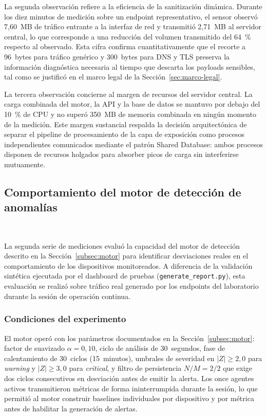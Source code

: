 La segunda observación refiere a la eficiencia de la sanitización 
dinámica. Durante los diez minutos de medición sobre un endpoint 
representativo, el sensor observó 7{,}60~MB de tráfico entrante a 
la interfaz de red y transmitió 2{,}71~MB al servidor central, lo 
que corresponde a una reducción del volumen transmitido del 
64~\% respecto al observado. Esta cifra confirma 
cuantitativamente que el recorte a 96~bytes para tráfico genérico 
y 300~bytes para DNS y TLS preserva la información diagnóstica 
necesaria al tiempo que descarta los payloads sensibles, tal como 
se justificó en el marco legal de la Sección~\ref{sec:marco-legal}.

La tercera observación concierne al margen de recursos del 
servidor central. La carga combinada del motor, la API y la base 
de datos se mantuvo por debajo del 10~\% de CPU y no superó 
350~MB de memoria combinada en ningún momento de la medición. 
Este margen sustancial respalda la decisión arquitectónica de 
separar el pipeline de procesamiento de la capa de exposición como 
procesos independientes comunicados mediante el patrón Shared 
Database: ambos procesos disponen de recursos holgados para 
absorber picos de carga sin interferirse mutuamente.

\subsection{Comportamiento del motor de detección de anomalías}
~\label{subsec:res-motor}

La segunda serie de mediciones evaluó la capacidad del motor de
detección descrito en la Sección~\ref{subsec:motor} para
identificar desviaciones reales en el comportamiento de los
dispositivos monitoreados. A diferencia de la validación sintética
ejecutada por el dashboard de pruebas (\texttt{generate\_report.py}),
esta evaluación se realizó sobre tráfico real generado por los
endpoints del laboratorio durante la sesión de operación continua.

\subsubsection{Condiciones del experimento}

El motor operó con los parámetros documentados en la
Sección~\ref{subsec:motor}: factor de suavizado
$\alpha = 0{,}10$, ciclo de análisis de 30~segundos, fase de
calentamiento de 30~ciclos (15~minutos), umbrales de severidad en
$|Z| \geq 2{,}0$ para \textit{warning} y $|Z| \geq 3{,}0$ para
\textit{critical}, y filtro de persistencia $N/M = 2/2$ que exige
dos ciclos consecutivos en desviación antes de emitir la alerta.
Los once agentes activos transmitieron métricas de forma
ininterrumpida durante la sesión, lo que permitió al motor
construir baselines individuales por dispositivo y por métrica
antes de habilitar la generación de alertas.

